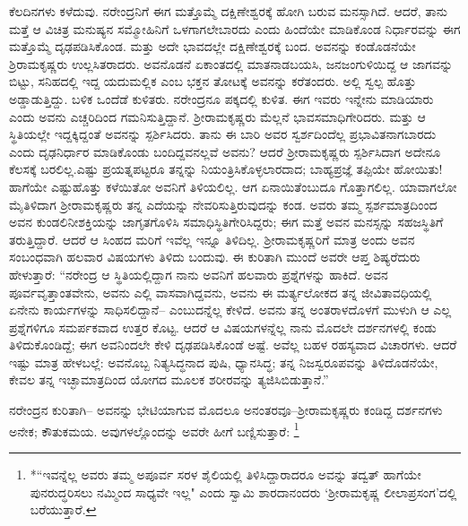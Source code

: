 ಕೆಲದಿನಗಳು ಕಳೆದುವು. ನರೇಂದ್ರನಿಗೆ ಈಗ ಮತ್ತೊಮ್ಮೆ ದಕ್ಷಿಣೇಶ್ವರಕ್ಕೆ ಹೋಗಿ ಬರುವ ಮನಸ್ಸಾಗಿದೆ. ಆದರೆ, ತಾನು ಮತ್ತೆ ಆ ವಿಚಿತ್ರ ಮನುಷ್ಯನ ಸಮ್ಮೋಹಿನಿಗೆ ಒಳಗಾಗಲೇಬಾರದು ಎಂದು ಹಿಂದೆಯೇ ಮಾಡಿಕೊಂಡ ನಿರ್ಧಾರವನ್ನು ಈಗ ಮತ್ತೊಮ್ಮೆ ದೃಢಪಡಿಸಿಕೊಂಡ. ಮತ್ತು ಅದೇ ಭಾವದಲ್ಲೇ ದಕ್ಷಿಣೇಶ್ವರಕ್ಕೆ ಬಂದ. ಅವನನ್ನು ಕಂಡೊಡನೆಯೇ ಶ್ರಿರಾಮಕೃಷ್ಣರು ಉಲ್ಲಸಿತರಾದರು. ಅವನೊಡನೆ ಏಕಾಂತದಲ್ಲಿ ಮಾತನಾಡಬಯಸಿ, ಜನಜಂಗುಳಿಯಿದ್ದ ಆ ಜಾಗವನ್ನು ಬಿಟ್ಟು, ಸನಿಹದಲ್ಲಿ ಇದ್ದ ಯದುಮಲ್ಲಿಕ ಎಂಬ ಭಕ್ತನ ತೋಟಕ್ಕೆ ಅವನನ್ನು ಕರೆತಂದರು. ಅಲ್ಲಿ ಸ್ವಲ್ಪ ಹೊತ್ತು ಅಡ್ಡಾಡುತ್ತಿದ್ದು. ಬಳಿಕ ಒಂದೆಡೆ ಕುಳಿತರು. ನರೇಂದ್ರನೂ ಪಕ್ಕದಲ್ಲಿ ಕುಳಿತ. ಈಗ ಇವರು ಇನ್ನೇನು ಮಾಡಿಯಾರು ಎಂದು ಅವನು ಎಚ್ಚರಿದಿಂದ ಗಮನಿಸುತ್ತಿದ್ದಾನೆ. ಶ್ರೀರಾಮಕೃಷ್ಣರು ಮೆಲ್ಲನೆ ಭಾವಸಮಾಧಿಗೇರಿದರು. ಮತ್ತು ಆ ಸ್ಥಿತಿಯಲ್ಲೇ ಇದ್ದಕ್ಕಿದ್ದಂತೆ ಅವನನ್ನು ಸ್ಪರ್ಶಿಸಿದರು. ತಾನು ಈ ಬಾರಿ ಅವರ ಸ್ವರ್ಶದಿಂದೆಲ್ಲ ಪ್ರಭಾವಿತನಾಗಬಾರದು ಎಂದು ದೃಢನಿರ್ಧಾರ ಮಾಡಿಕೊಂಡು ಬಂದಿದ್ದವನಲ್ಲವೆ ಅವನು? ಆದರೆ ಶ್ರೀರಾಮಕೃಷ್ಣರು ಸ್ಪರ್ಶಿಸಿದಾಗ ಅದೇನೂ ಕೆಲಸಕ್ಕೆ ಬರಲಿಲ್ಲ.ಎಷ್ಟು ಪ್ರಯತ್ನಪಟ್ಟರೂ ತನ್ನನ್ನು ನಿಯಂತ್ರಿಸಿಕೊಳ್ಳಲಾರದಾದ; ಬಾಹ್ಯಪ್ರಜ್ಞೆ ತಪ್ಪಿಯೇ ಹೋಯಿತು! ಹಾಗೆಯೇ ಎಷ್ಟುಹೊತ್ತು ಕಳೆಯಿತೋ ಅವನಿಗೆ ತಿಳಿಯಲಿಲ್ಲ. ಆಗ ಏನಾಯಿತೆಂಬುದೂ ಗೊತ್ತಾಗಲಿಲ್ಲ. ಯಾವಾಗಲೋ ಮೈತಿಳಿದಾಗ ಶ್ರೀರಾಮಕೃಷ್ಣರು ತನ್ನ ಎದೆಯನ್ನು ನೇವರಿಸುತ್ತಿರುವುದನ್ನು ಕಂಡ. ಅವರು ತಮ್ಮ ಸ್ಪರ್ಶಮಾತ್ರದಿಂಂದ ಅವನ ಕುಂಡಲಿನೀಶಕ್ತಿಯನ್ನು ಜಾಗೃತಗೊಳಿಸಿ ಸಮಾಧಿಸ್ಥಿತಿಗೇರಿಸಿದ್ದರು; ಈಗ ಮತ್ತೆ ಅವನ ಮನಸ್ಸನ್ನು ಸಹಜಸ್ಥಿತಿಗೆ ತರುತ್ತಿದ್ದಾರೆ. ಆದರೆ ಆ ಸಿಂಹದ ಮರಿಗೆ ಇವೆಲ್ಲ ಇನ್ನೂ ತಿಳಿದಿಲ್ಲ. ಶ್ರೀರಾಮಕೃಷ್ಣರಿಗೆ ಮಾತ್ರ ಅಂದು ಅವನ ಸಂಬಂಧವಾಗಿ ಹಲವಾರ ವಿಷಯಗಳು ತಿಳಿದು ಬಂದುವು. ಈ ಕುರಿತಾಗಿ ಮುಂದೆ ಅವರೇ ಆಪ್ತ ಶಿಷ್ಯರೆದುರು ಹೇಳುತ್ತಾರೆ: “ನರೇಂದ್ರ ಆ ಸ್ಥಿತಿಯಲ್ಲಿದ್ದಾಗ ನಾನು ಅವನಿಗೆ ಹಲವಾರು ಪ್ರಶ್ನೆಗಳನ್ನು ಹಾಕಿದೆ. ಅವನ ಪೂರ್ವವೃತ್ತಾಂತವೇನು, ಅವನು ಎಲ್ಲಿ ವಾಸವಾಗಿದ್ದವನು, ಅವನು ಈ ಮರ್ತ್ಯಲೋಕದ ತನ್ನ ಜೀವಿತಾವಧಿಯಲ್ಲಿ ಏನೇನು ಕಾರ್ಯಗಳನ್ನು ಸಾಧಿಸಲಿದ್ದಾನೆ– ಎಂಬುದನ್ನೆಲ್ಲ ಕೇಳಿದೆ. ಅವನು ತನ್ನ ಅಂತರಾಳದೊಳಗೆ ಮುಳುಗಿ ಆ ಎಲ್ಲ ಪ್ರಶ್ನೆಗಳಿಗೂ ಸಮರ್ಪಕವಾದ ಉತ್ತರ ಕೊಟ್ಟ. ಆದರೆ ಆ ವಿಷಯಗಳನ್ನೆಲ್ಲ ನಾನು ಮೊದಲೇ ದರ್ಶನಗಳಲ್ಲಿ ಕಂಡು ತಿಳಿದುಕೊಂಡಿದ್ದೆ; ಈಗ ಅವನಿಂದಲೇ ಕೇಳಿ ದೃಢಪಡಿಸಿಕೊಂಡೆ ಅಷ್ಟೆ. ಅವೆಲ್ಲ ಬಹಳ ರಹಸ್ಯವಾದ ವಿಚಾರಗಳು. ಆದರೆ ಇಷ್ಟು ಮಾತ್ರ ಹೇಳಬಲ್ಲೆ: ಅವನೊಬ್ಬ ನಿತ್ಯಸಿದ್ಧನಾದ ಪುಷಿ, ಧ್ಯಾನಸಿದ್ಧ; ತನ್ನ ನಿಜಸ್ವರೂಪವನ್ನು ತಿಳಿದೊಡನೆಯೇ, ಕೇವಲ ತನ್ನ ಇಚ್ಛಾಮಾತ್ರದಿಂದ ಯೋಗದ ಮೂಲಕ ಶರೀರವನ್ನು ತ್ಯಜಿಸಿಬಿಡುತ್ತಾನೆ.”

ನರೇಂದ್ರನ ಕುರಿತಾಗಿ– ಅವನನ್ನು ಭೇಟಿಯಾಗುವ ಮೊದಲೂ ಅನಂತರವೂ–ಶ್ರೀರಾಮಕೃಷ್ಣರು ಕಂಡಿದ್ದ ದರ್ಶನಗಳು ಅನೇಕ; ಕೌತುಕಮಯ. ಅವುಗಳಲ್ಲೊಂದನ್ನು ಅವರೇ ಹೀಗೆ ಬಣ್ಣಿಸುತ್ತಾರೆ: \footnote{*``ಇವನ್ನೆಲ್ಲ ಅವರು ತಮ್ಮ ಅಪೂರ್ವ ಸರಳ ಶೈಲಿಯಲ್ಲಿ ತಿಳಿಸಿದ್ದಾರಾದರೂ ಅವನ್ನು ತದ್ವತ್ ಹಾಗೆಯೇ ಪುನರುದ್ಧರಿಸಲು ನಮ್ಮಿಂದ ಸಾಧ್ಯವೇ ಇಲ್ಲ" ಎಂದು ಸ್ವಾಮಿ ಶಾರದಾನಂದರು `ಶ್ರೀರಾಮಕೃಷ್ಣ ಲೀಲಾಪ್ರಸಂಗ'ದಲ್ಲಿ ಬರೆಯುತ್ತಾರೆ.}

